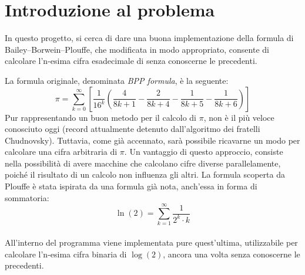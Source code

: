 \section{Introduzione al problema}
In questo progetto, si cerca di dare una buona implementazione della formula di Bailey–Borwein–Plouffe, che modificata in modo appropriato, consente di calcolare l'n-esima cifra esadecimale di \p senza conoscerne le precedenti.

\noindent La formula originale, denominata \textit{BPP formula}, è la seguente:
\begin{equation*}
\pi = \sum\limits_{k=0}^{\infty} \left[ \frac{1}{16^k}\left( \frac{4}{8k+1} - \frac{2}{8k+4} - \frac{1}{8k+5} - \frac{1}{8k+6} \right) \right]
\end{equation*}
Pur rappresentando un buon metodo per il calcolo di $\pi$, non è il più veloce conosciuto oggi (record attualmente detenuto dall'algoritmo dei fratelli Chudnovsky). Tuttavia, come già accennato, sarà possibile ricavarne un modo per calcolare una cifra arbitraria di $\pi$.
Un vantaggio di questo approccio, consiste nella possibilità di avere macchine che calcolano cifre diverse parallelamente, poiché il risultato di un calcolo non influenza gli altri.
\bigbreak \noindent
La formula scoperta da Plouffe è stata ispirata da una formula già nota, anch'essa in forma di sommatoria:
$$ \ln(2)= \sum\limits_{k=1}^{\infty} \frac{1}{2^k \cdot k} $$
\\
All'interno del programma viene implementata pure quest'ultima, utilizzabile per calcolare l'n-esima cifra binaria di $\log(2)$, ancora una volta senza conoscerne le precedenti.